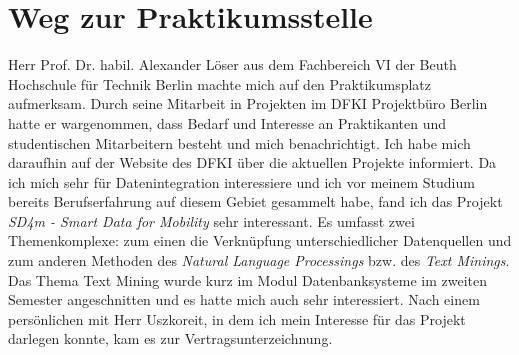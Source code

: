 \section{Weg zur Praktikumsstelle}
\label{sec:intro:wegZurPraktikumsstelle}
Herr Prof. Dr. habil. Alexander Löser aus dem Fachbereich VI der Beuth Hochschule für Technik Berlin machte mich auf den Praktikumsplatz aufmerksam. Durch seine Mitarbeit in Projekten im DFKI Projektbüro Berlin hatte er wargenommen, dass Bedarf und Interesse an Praktikanten und studentischen Mitarbeitern besteht und mich benachrichtigt.
Ich habe mich daraufhin auf der Website des DFKI über die aktuellen Projekte informiert.
Da ich mich sehr für Datenintegration interessiere und ich vor meinem Studium bereits Berufserfahrung auf diesem Gebiet gesammelt habe, fand ich das Projekt \textit{SD4m - Smart Data for Mobility} sehr interessant.
Es umfasst zwei Themenkomplexe: zum einen die Verknüpfung unterschiedlicher Datenquellen und zum anderen Methoden des \textit{Natural Language Processings} bzw. des \textit{Text Minings}.
Das Thema Text Mining wurde kurz im Modul Datenbanksysteme im zweiten Semester angeschnitten und es hatte mich auch sehr interessiert.
Nach einem persönlichen mit Herr Uszkoreit, in dem ich mein Interesse für das Projekt darlegen konnte, kam es zur Vertragsunterzeichnung.